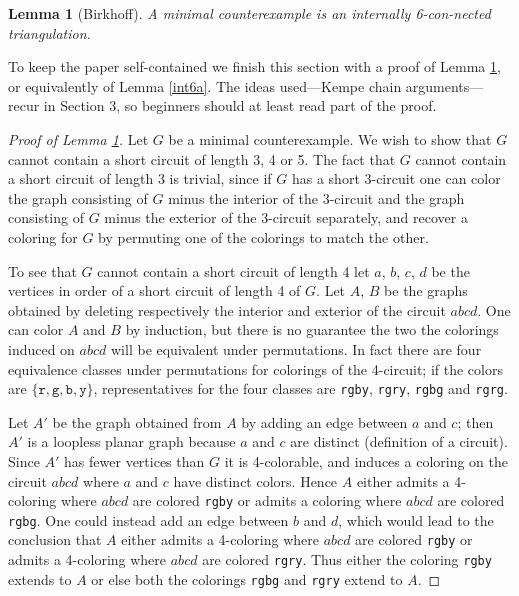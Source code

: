 \documentclass[11pt]{article}
\newtheorem{lemma}[theorem]{Lemma}     %
\newcommand{\cR}{\texttt{r}}
\newcommand{\cG}{\texttt{g}}
\newcommand{\cB}{\texttt{b}}
\newcommand{\cY}{\texttt{y}}
\newcommand{\gA}{A}
\newcommand{\gB}{B}
\begin{document}
\begin{lemma}[Birkhoff]\label{int6}
A minimal counterexample is an internally 6-con-nected triangulation.
\end{lemma}

\noindent To keep the paper self-contained we finish this section with a proof of Lemma \ref{int6}, or equivalently of Lemma \ref{int6a}. The ideas used---Kempe chain arguments---recur in Section 3, so beginners should at least read part of the proof.

\begin{proof}[Proof of Lemma \ref{int6}] Let $G$ be a minimal counterexample. We wish to show that $G$ cannot contain a short circuit of length 3, 4 or 5. The fact that $G$ cannot contain a short circuit of length 3 is trivial, since if $G$ has a short 3-circuit one can color the graph consisting of $G$ minus the interior of the 3-circuit and the graph consisting of $G$ minus the exterior of the 3-circuit separately, and recover a coloring for $G$ by permuting one of the colorings to match the other. 

To see that $G$ cannot contain a short circuit of length 4 let $a$, $b$, $c$, $d$ be the vertices in order of a short circuit of length 4 of $G$. Let $\gA$, $\gB$ be the graphs obtained by deleting respectively the interior and exterior of the circuit $abcd$. One can color $\gA$ and $\gB$ by induction, but there is no guarantee the two the colorings induced on $abcd$ will be equivalent under permutations. In fact there are four equivalence classes under permutations for colorings of the 4-circuit; if the colors are $\{\cR, \cG, \cB, \cY\}$, representatives for the four classes are \cR\cG\cB\cY, \cR\cG\cR\cY, \cR\cG\cB\cG{} and \cR\cG\cR\cG.

Let $\gA'$ be the graph obtained from $\gA$ by adding an edge between $a$ and $c$; then $\gA'$ is a loopless planar graph 
because $a$ and $c$ are distinct (definition of a circuit). Since $\gA'$ has fewer vertices than $G$ it is 4-colorable, and induces a coloring on the circuit $abcd$ where $a$ and $c$ have distinct colors. Hence $\gA$ either admits a 4-coloring where $abcd$ are colored \cR\cG\cB\cY{} or admits a coloring where $abcd$ are colored \cR\cG\cB\cG. One could instead add an edge between $b$ and $d$, which would lead to the conclusion that $\gA$ either admits a 4-coloring where $abcd$ are colored \cR\cG\cB\cY{} or admits a 4-coloring where $abcd$ are colored \cR\cG\cR\cY. Thus either the coloring \cR\cG\cB\cY{} extends to $\gA$ or else both the colorings \cR\cG\cB\cG{} and \cR\cG\cR\cY{} extend to $\gA$.


\end{proof}
\end{document}
